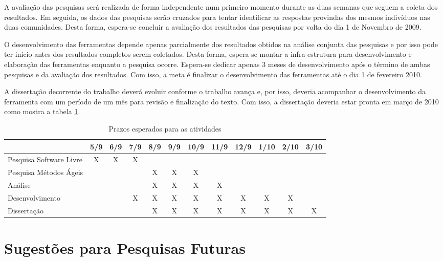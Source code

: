 A avaliação das pesquisas será realizada de forma independente num
primeiro momento durante as duas semanas que seguem a coleta dos
resultados. Em seguida, os dados das pesquisas serão cruzados para
tentar identificar as respostas provindas dos mesmos indivíduos nas
duas comunidades. Desta forma, espera-se concluir a avaliação dos
resultados das pesquisas por volta do dia 1 de Novembro de 2009.

O desenvolvimento das ferramentas depende apenas parcialmente dos
resultados obtidos na análise conjunta das pesquisas e por isso pode
ter início antes dos resultados completos serem coletados. Desta
forma, espera-se montar a infra-estrutura para desenvolvimento e
elaboração das ferramentas enquanto a pesquisa ocorre. Espera-se
dedicar apenas 3 meses de desenvolvimento após o término de ambas
pesquisas e da avaliação dos resultados. Com isso, a meta é finalizar
o desenvolvimento das ferramentas até o dia 1 de fevereiro 2010.

A dissertação decorrente do trabalho deverá evoluir conforme o
trabalho avança e, por isso, deveria acompanhar o desenvolvimento da
ferramenta com um período de um mês para revisão e finalização do
texto. Com isso, a dissertação deveria estar pronta em março de 2010
como mostra a tabela \ref{tab:crono}.

\begin{table}
  \centering
  \begin{tabular}{|l|c|c|c|c|c|c|c|c|c|c|c|}
    \hline
    & 5/9 & 6/9 & 7/9 & 8/9 & 9/9 & 10/9 & 11/9 & 12/9 &
    1/10 & 2/10 & 3/10\\
    \hline
    Pesquisa Software Livre & X & X & X & & & & & & & &\\
    \hline
    Pesquisa Métodos Ágeis & & & & X & X & X & & & & &\\
    \hline
    Análise  & & & & X & X & X & X & & & &\\
    \hline
    Desenvolvimento & & & X & X & X & X & X & X & X & X & \\
    \hline
    Dissertação & & & & X & X & X & X & X & X & X & X \\
    \hline
  \end{tabular}
  \caption{Prazos esperados para as atividades}
  \label{tab:crono}
\end{table}

\section{Sugestões para Pesquisas Futuras}
\label{sec:sugestoes}

